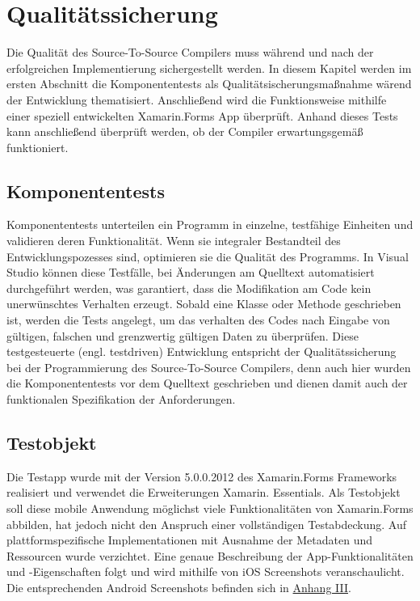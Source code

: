 \chapter{Qualitätssicherung}
\label{chap:Qualitätssicherung}
Die Qualität des Source-To-Source Compilers muss während und nach der erfolgreichen Implementierung sichergestellt werden. In diesem Kapitel werden im ersten Abschnitt die Komponententests als Qualitätsischerungsmaßnahme wärend der Entwicklung thematisiert.  Anschließend wird die Funktionsweise mithilfe einer speziell entwickelten Xamarin.Forms App überprüft.  Anhand dieses Tests kann anschließend überprüft werden, ob  der Compiler erwartungsgemäß funktioniert. 

\section{Komponententests}
Komponententests unterteilen ein Programm in einzelne,  testfähige Einheiten und validieren deren Funktionalität.  Wenn sie integraler Bestandteil des Entwicklungspozesses sind,  optimieren sie die Qualität des Programms. 
In Visual Studio können diese Testfälle, bei Änderungen am Quelltext automatisiert durchgeführt 
werden, was garantiert, dass die Modifikation am Code kein unerwünschtes Verhalten erzeugt.   Sobald eine Klasse oder Methode geschrieben ist, werden die Tests angelegt,  um das verhalten des Codes nach Eingabe von gültigen,  falschen und grenzwertig gültigen Daten zu überprüfen.
Diese testgesteuerte (engl. testdriven) Entwicklung entspricht der Qualitätssicherung bei 
der Programmierung des Source-To-Source Compilers, denn auch hier wurden die Komponententests vor dem Quelltext geschrieben und dienen damit auch der funktionalen Spezifikation der Anforderungen.

\section{Testobjekt}
Die Testapp wurde mit der Version 5.0.0.2012 des Xamarin.Forms Frameworks realisiert und verwendet die Erweiterungen Xamarin. Essentials.  Als Testobjekt soll diese mobile Anwendung möglichst viele Funktionalitäten von Xamarin.Forms abbilden,  hat jedoch nicht den Anspruch einer vollständigen Testabdeckung.
Auf plattformspezifische Implementationen mit Ausnahme der Metadaten und Ressourcen wurde verzichtet.  Eine genaue Beschreibung der App-Funktionalitäten und -Eigenschaften folgt und wird mithilfe von iOS Screenshots veranschaulicht.  Die entsprechenden Android Screenshots befinden sich in \hyperref[chap:AnhangAndroidScreenshots]{Anhang III}.

